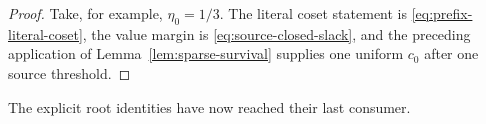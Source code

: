 \begin{proof}
Take, for example, $\eta_0=1/3$.  The literal coset statement is
\eqref{eq:prefix-literal-coset}, the value margin is
\eqref{eq:source-closed-slack}, and the preceding application of
Lemma~\ref{lem:sparse-survival} supplies one uniform $c_0$ after one source
threshold.
\end{proof}

The explicit root identities have now reached their last consumer.

